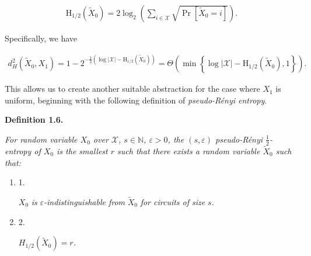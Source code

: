 \documentclass[10pt,a4paper]{article}
\begin{document}
\[\begin{gathered}
\mathrm{H}_{1/2}\left(\widetilde{X}_{0}\right)=2\log_{2}\left(\sum_{i\in\mathcal{X}}\sqrt{\Pr[\widetilde{X}_{0}=i]}\right).
\end{gathered}\]


Specifically, we have\par


\[\begin{gathered}
d_{H}^{2}\left(\widetilde{X}_{0},X_{1}\right)=1-2^{-\frac{1}{2}\left(\log|\mathcal{X}|-\mathrm{H}_{1/2}\left(\widetilde{X}_{0}\right)\right)}=\Theta\left(\min\left\{\log|\mathcal{X}|-\mathrm{H}_{1/2}\left(\widetilde{X}_{0}\right),1\right\}\right).
\end{gathered}\]


This allows us to create another suitable abstraction for the case where $X_{1}$ is uniform, beginning with the following definition of \emph{pseudo-Rényi entropy}.\par





\par\medskip\noindent\textbf{
\textbf{Definition 1.6}\textbf{.}
}\par



\emph{For random variable $X_{0}$ over $\mathcal{X}$, $s\in\mathbb{N}$, $\varepsilon>0$, the $(s,\varepsilon)$ pseudo-Rényi $\frac{1}{2}$-entropy of $X_{0}$ is the smallest $r$ such that there exists a random variable $\widetilde{X}_{0}$ such that:}\par


\begin{enumerate}


\item[] 
1. 


$X_{0}$\emph{ is }$\varepsilon$\emph{-indistinguishable from }$\widetilde{X}_{0}$\emph{ for circuits of size }$s$\emph{.}\par





\item[] 
2. 


$H_{1/2}\left(\widetilde{X}_{0}\right)=r$\emph{.}\par





\end{enumerate}
\end{document}

